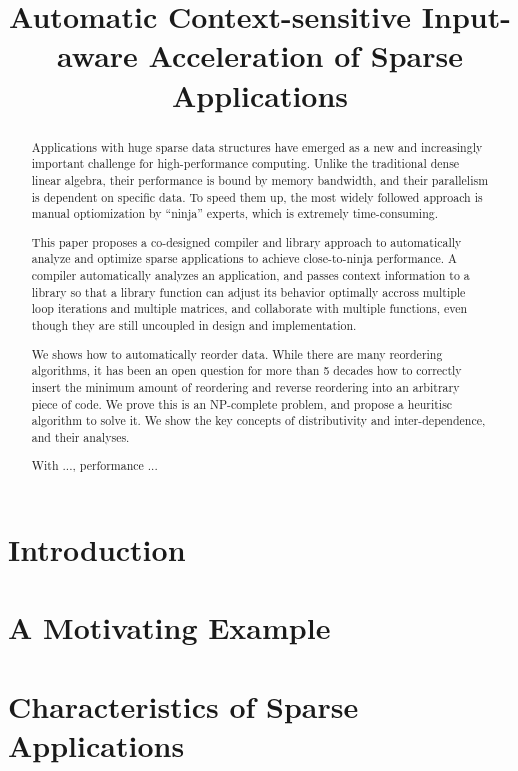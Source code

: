 \documentclass[pldi]{sigplanconf-pldi15}
\begin{document}
%
%

\title{Automatic Context-sensitive Input-aware Acceleration of Sparse Applications }

\maketitle
\begin{abstract}

Applications with huge sparse data structures have emerged as a new and increasingly important challenge for high-performance computing. Unlike the traditional dense linear algebra, their  performance is bound by memory bandwidth, and their parallelism is dependent on specific data. To speed them up, the most widely followed approach is manual optiomization by ``ninja'' experts, which is extremely time-consuming.

This paper proposes a co-designed compiler and library approach to automatically analyze and optimize sparse applications to achieve close-to-ninja performance. A compiler automatically analyzes an application, and passes context information to a library so that a library function can adjust its behavior optimally accross multiple loop iterations and multiple matrices, and collaborate with multiple functions, even though they are still uncoupled in design and implementation. 
   
We shows how to automatically reorder data. While there are many reordering algorithms, it has been an open question for more than 5 decades how to correctly insert the minimum amount of reordering and reverse reordering into an arbitrary piece of code. We prove this is an NP-complete problem, and propose a heuritisc algorithm to solve it. We show the key concepts of distributivity and inter-dependence, and their analyses. 

With ..., performance ...


\end{abstract}

\section{Introduction}
\section{A Motivating Example}
\section{Characteristics of Sparse Applications}
\end{document}
